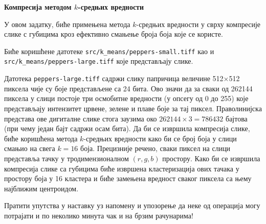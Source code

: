 \item{} {\bf Компресија методом $k$-средњих вредности}

У овом задатку, биће примењена метода $k$-средњих вредности у сврху компресије слике с губицима кроз ефективно смањење броја боја које се користе.

Биће коришћене датотеке \texttt{src/k\_means/peppers-small.tiff} као и \texttt{src/k\_means/peppers-large.tiff} које представљају слике.

Датотека \texttt{peppers-large.tiff} садржи слику папричица величине 512$\times$512 пиксела чије су боје представљене са 24 бита. Ово значи да за сваки од 262144 пиксела у слици постоје три осмобитне вредности (у опсегу од 0 до 255) које представљају интензитет црвене, зелене и плаве боје за тај пиксел. Праволинијска представа ове дигиталне слике стога заузима око $262144 \times 3 =
786432$ бајтова (при чему један бајт садржи осам бита). Да би се извршила компресија слике, биће коришћена метода $k$-средњих вредности како би се број боја у слици смањио на свега $k=16$ боја. Прецизније речено, сваки пиксел на слици представља тачку у тродимензионалном $(r, g, b)$ простору. Како би се извршила компресија слике са губицима биће извршена кластеризација ових тачака у простору боја у 16 кластера и биће замењена вредност сваког пиксела са њему најближим центроидом.

Пратити упутства у наставку уз напомену и упозорење да неке од операција могу потрајати и по неколико минута чак и на брзим рачунарима!

\begin{enumerate}

  
\ifnum{} {
  
} \fi


  

\ifnum{} {
  
} \fi

\end{enumerate}

